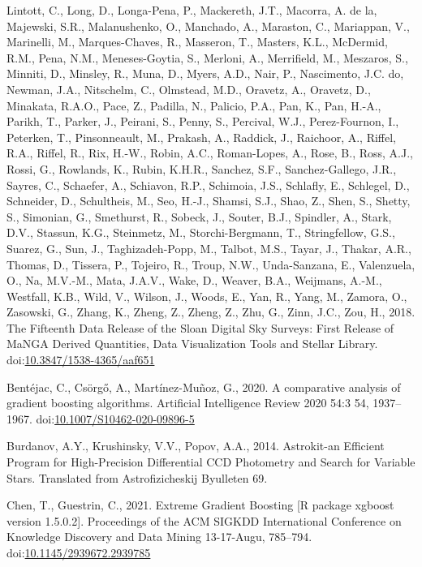 \documentclass[]{elsarticle} %
\newlength{\cslhangindent}
\newlength{\cslentryspacingunit} %
\newenvironment{CSLReferences}[2] %
 {%
  \setlength{\parindent}{0pt}
  \ifodd #1
  \let\oldpar\par
  \def\par{\hangindent=\cslhangindent\oldpar}
  \fi
  \setlength{\parskip}{#2\cslentryspacingunit}
 }%
 {}
\begin{document}
\begin{CSLReferences}{1}{0}
Lintott, C., Long, D., Longa-Pena, P., Mackereth, J.T., Macorra, A. de
la, Majewski, S.R., Malanushenko, O., Manchado, A., Maraston, C.,
Mariappan, V., Marinelli, M., Marques-Chaves, R., Masseron, T., Masters,
K.L., McDermid, R.M., Pena, N.M., Meneses-Goytia, S., Merloni, A.,
Merrifield, M., Meszaros, S., Minniti, D., Minsley, R., Muna, D., Myers,
A.D., Nair, P., Nascimento, J.C. do, Newman, J.A., Nitschelm, C.,
Olmstead, M.D., Oravetz, A., Oravetz, D., Minakata, R.A.O., Pace, Z.,
Padilla, N., Palicio, P.A., Pan, K., Pan, H.-A., Parikh, T., Parker, J.,
Peirani, S., Penny, S., Percival, W.J., Perez-Fournon, I., Peterken, T.,
Pinsonneault, M., Prakash, A., Raddick, J., Raichoor, A., Riffel, R.A.,
Riffel, R., Rix, H.-W., Robin, A.C., Roman-Lopes, A., Rose, B., Ross,
A.J., Rossi, G., Rowlands, K., Rubin, K.H.R., Sanchez, S.F.,
Sanchez-Gallego, J.R., Sayres, C., Schaefer, A., Schiavon, R.P.,
Schimoia, J.S., Schlafly, E., Schlegel, D., Schneider, D., Schultheis,
M., Seo, H.-J., Shamsi, S.J., Shao, Z., Shen, S., Shetty, S., Simonian,
G., Smethurst, R., Sobeck, J., Souter, B.J., Spindler, A., Stark, D.V.,
Stassun, K.G., Steinmetz, M., Storchi-Bergmann, T., Stringfellow, G.S.,
Suarez, G., Sun, J., Taghizadeh-Popp, M., Talbot, M.S., Tayar, J.,
Thakar, A.R., Thomas, D., Tissera, P., Tojeiro, R., Troup, N.W.,
Unda-Sanzana, E., Valenzuela, O., Na, M.V.-M., Mata, J.A.V., Wake, D.,
Weaver, B.A., Weijmans, A.-M., Westfall, K.B., Wild, V., Wilson, J.,
Woods, E., Yan, R., Yang, M., Zamora, O., Zasowski, G., Zhang, K.,
Zheng, Z., Zheng, Z., Zhu, G., Zinn, J.C., Zou, H., 2018. {The Fifteenth
Data Release of the Sloan Digital Sky Surveys: First Release of MaNGA
Derived Quantities, Data Visualization Tools and Stellar Library}.
doi:\href{https://doi.org/10.3847/1538-4365/aaf651}{10.3847/1538-4365/aaf651}

\leavevmode{}%
Bentéjac, C., Csörgő, A., Martínez-Muñoz, G., 2020. {A comparative
analysis of gradient boosting algorithms}. Artificial Intelligence
Review 2020 54:3 54, 1937--1967.
doi:\href{https://doi.org/10.1007/S10462-020-09896-5}{10.1007/S10462-020-09896-5}

\leavevmode{}%
Burdanov, A.Y., Krushinsky, V.V., Popov, A.A., 2014. {Astrokit-an
Efficient Program for High-Precision Differential CCD Photometry and
Search for Variable Stars}. Translated from Astrofizicheskij Byulleten
69.

\leavevmode{}%
Chen, T., Guestrin, C., 2021. {Extreme Gradient Boosting {[}R package
xgboost version 1.5.0.2{]}}. Proceedings of the ACM SIGKDD International
Conference on Knowledge Discovery and Data Mining 13-17-Augu, 785--794.
doi:\href{https://doi.org/10.1145/2939672.2939785}{10.1145/2939672.2939785}


\end{CSLReferences}
\end{document}
